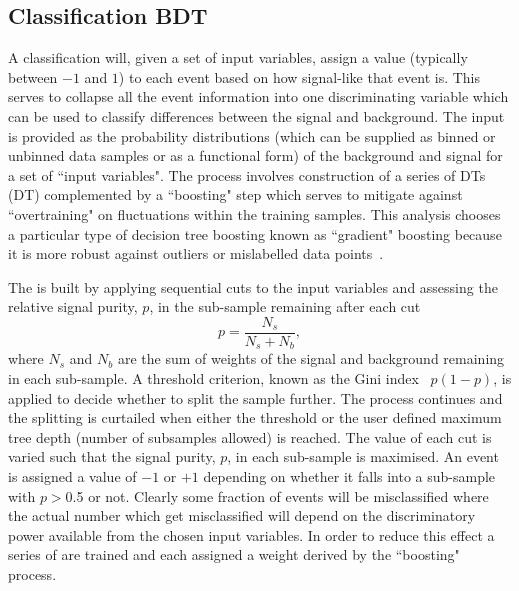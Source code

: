 \subsection{Classification \acs{BDT}}
A classification \BDT will, given a set of input variables, assign a value (typically between $-1$ and $1$) to each event based on how signal-like that event is. This serves to collapse all the event information into one discriminating variable which can be used to classify differences between the signal and background. The input is provided as the probability distributions (which can be supplied as binned or unbinned data samples or as a functional form) of the background and signal for a set of ``input variables". The process involves construction of a series of \aclp{DT} (\acs{DT}) complemented by a ``boosting" step which serves to mitigate against ``overtraining" on fluctuations within the training samples. This analysis chooses a particular type of decision tree boosting known as ``gradient" boosting because it is more robust against outliers or mislabelled data points~\cite{TMVA}.

The \DT is built by applying sequential cuts to the input variables and assessing the relative signal purity, $p$, in the sub-sample remaining after each cut
\begin{equation}
  p = \frac{N_{s}}{N_{s}+N_{b}},
\end{equation}
where $N_{s}$ and $N_{b}$ are the sum of weights of the signal and background remaining in each sub-sample. A threshold criterion, known as the Gini index~\cite{TMVA} $p(1-p)$, is applied to decide whether to split the sample further. The process continues and the splitting is curtailed when either the threshold or the user defined maximum tree depth (number of subsamples allowed) is reached. The value of each cut is varied such that the signal purity, $p$, in each sub-sample is maximised. An event is assigned a value of $-1$ or $+1$ depending on whether it falls into a sub-sample with $p>$0.5 or not. Clearly some fraction of events will be misclassified where the actual number which get misclassified will depend on the discriminatory power available from the chosen input variables. In order to reduce this effect a series of \DTs are trained and each assigned a weight derived by the ``boosting" process. 

